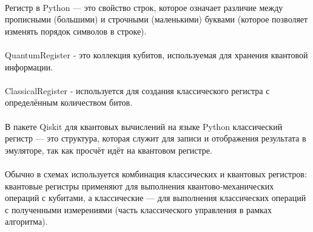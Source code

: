 \documentclass[12pt,a4paper]{article}
\begin{document}
		\hspace{1em}\\
		Регистр в Python — это свойство строк, которое означает различие между прописными (большими) и строчными (маленькими) буквами (которое позволяет изменять порядок символов в строке).\\
	
		\hspace{1em}\\
		QuantumRegister  - это коллекция кубитов, используемая для хранения квантовой информации.\\
	
		\hspace{1em}\\
		ClassicalRegister - используется для создания классического регистра с определённым количеством битов.\\
	
		\hspace{1em}\\
		В пакете Qiskit для квантовых вычислений на языке Python классический регистр — это структура, которая служит для записи и отображения результата в эмуляторе, так как просчёт идёт на квантовом регистре.\\
		
		\hspace{1em}\\
		Обычно в схемах используется комбинация классических и квантовых регистров: квантовые регистры применяют для выполнения квантово-механических операций с кубитами, а классические — для выполнения классических операций с полученными измерениями (часть классического управления в рамках алгоритма).\\
		
\end{document}
